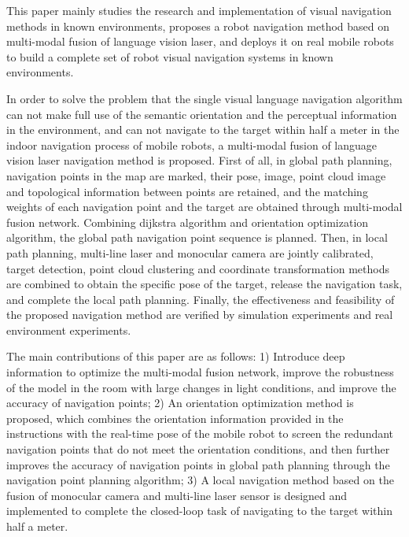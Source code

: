     This paper mainly studies the research and implementation of visual navigation methods in known environments, proposes a robot navigation method based on multi-modal fusion of language vision laser, and deploys it on real mobile robots to build a complete set of robot visual navigation systems in known environments.

    In order to solve the problem that the single visual language navigation algorithm can not make full use of the semantic orientation and the perceptual information in the environment, and can not navigate to the target within half a meter in the indoor navigation process of mobile robots, a multi-modal fusion of language vision laser navigation method is proposed. First of all, in global path planning, navigation points in the map are marked, their pose, image, point cloud image and topological information between points are retained, and the matching weights of each navigation point and the target are obtained through multi-modal fusion network. Combining dijkstra algorithm and orientation optimization algorithm, the global path navigation point sequence is planned. Then, in local path planning, multi-line laser and monocular camera are jointly calibrated, target detection, point cloud clustering and coordinate transformation methods are combined to obtain the specific pose of the target, release the navigation task, and complete the local path planning. Finally, the effectiveness and feasibility of the proposed navigation method are verified by simulation experiments and real environment experiments.

    The main contributions of this paper are as follows: 1) Introduce deep information to optimize the multi-modal fusion network, improve the robustness of the model in the room with large changes in light conditions, and improve the accuracy of navigation points; 2) An orientation optimization method is proposed, which combines the orientation information provided in the instructions with the real-time pose of the mobile robot to screen the redundant navigation points that do not meet the orientation conditions, and then further improves the accuracy of navigation points in global path planning through the navigation point planning algorithm; 3) A local navigation method based on the fusion of monocular camera and multi-line laser sensor is designed and implemented to complete the closed-loop task of navigating to the target within half a meter.

